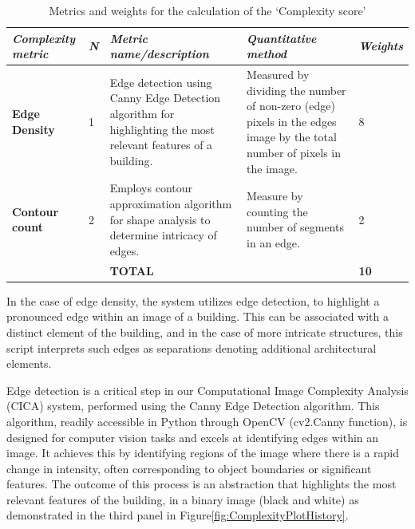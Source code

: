    \begin{table}[htb]
        \centering
        \small
        \caption{Metrics and weights for the calculation of the `Complexity score'}
        \label{tab:MetricsandWeights}
        \begin{tabularx}{\textwidth}{p{3.5cm} p{1cm} X X p{1cm}}
            \toprule
            \textit{Complexity metric} &
              \textit{N} &
              \textit{Metric name/description} &
              \textit{Quantitative   method} &
              \textit{Weights} \\ \midrule
            \textbf{Edge Density} &
              1 &
              Edge detection using Canny Edge Detection algorithm for highlighting the most relevant features of a building.
                &
              Measured by dividing the number of non-zero (edge) pixels in the edges image by the total number of pixels in the image.
                &
              8\\
            \textbf{Contour count} &
              2 &
              Employs contour approximation algorithm for shape analysis to determine intricacy of edges.
                &
              Measure by counting the number of segments in an edge.
                &
              2\\ \bottomrule
               &
               &
              \textbf{TOTAL} &
              &
              \textbf{10}\\ \bottomrule
        \end{tabularx}
    \end{table}

In the case of edge density, the system utilizes edge detection, to highlight a pronounced edge within an image of a building.
This can be associated with a distinct element of the building, and in the case of more intricate structures, this script interprets such edges as separations denoting additional architectural elements.

Edge detection is a critical step in our Computational Image Complexity Analysis (CICA) system, performed using the Canny Edge Detection algorithm\cite{EdgeOpenCV2023}.
This algorithm, readily accessible in Python through OpenCV (cv2.Canny function), is designed for computer vision tasks and excels at identifying edges within an image.
It achieves this by identifying regions of the image where there is a rapid change in intensity, often corresponding to object boundaries or significant features.
The outcome of this process is an abstraction that highlights the most relevant features of the building, in a binary image (black and white) as demonstrated in the third panel in Figure\ref{fig:ComplexityPlotHistory}.

